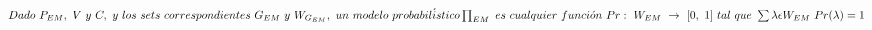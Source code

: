 \documentclass[]{article}
\begin{document}
		$Dado\ P_{EM} ,\ V\ y\ C,\ y\ los\ sets\ correspondientes\ G_{EM} \ y\ W_{G_{EM}} ,\ un\ modelo\ probabil\acute{i}stico\\
		\prod_{EM}\ es\ cualquier\ funci\acute{o}n\ Pr:\ W_{EM} \ \rightarrow \ [ 0,\ 1] \ tal\ que\ \sum \lambda \epsilon W_{EM} \ Pr( \lambda ) =1 \notag$
\end{document}
